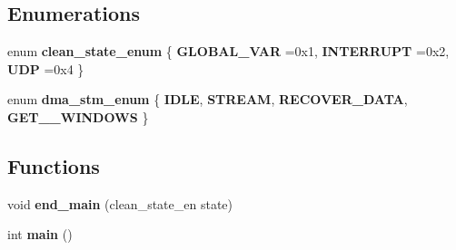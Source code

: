 \subsection*{Enumerations}
\begin{DoxyCompactItemize}
\item 
\mbox{\label{main_8c_aeafbc28e24788dc1a79c4f2e7926af20}} 
enum {\bfseries clean\+\_\+state\+\_\+enum} \{ {\bfseries G\+L\+O\+B\+A\+L\+\_\+\+V\+AR} =0x1, 
{\bfseries I\+N\+T\+E\+R\+R\+U\+PT} =0x2, 
{\bfseries U\+DP} =0x4
 \}
\item 
\mbox{\label{main_8c_a14177b2d0dd6999990312dbaeed1de00}} 
enum {\bfseries dma\+\_\+stm\+\_\+enum} \{ {\bfseries I\+D\+LE}, 
{\bfseries S\+T\+R\+E\+AM}, 
{\bfseries R\+E\+C\+O\+V\+E\+R\+\_\+\+D\+A\+TA}, 
{\bfseries G\+E\+T\+\_\+\_\+\+W\+I\+N\+D\+O\+WS}
 \}
\end{DoxyCompactItemize}
\subsection*{Functions}
\begin{DoxyCompactItemize}
\item 
\mbox{\label{main_8c_aa08c47b0de738675fd0573b3888e6804}} 
void {\bfseries end\+\_\+main} (clean\+\_\+state\+\_\+en state)
\item 
\mbox{\label{main_8c_ae66f6b31b5ad750f1fe042a706a4e3d4}} 
int {\bfseries main} ()
\end{DoxyCompactItemize}
